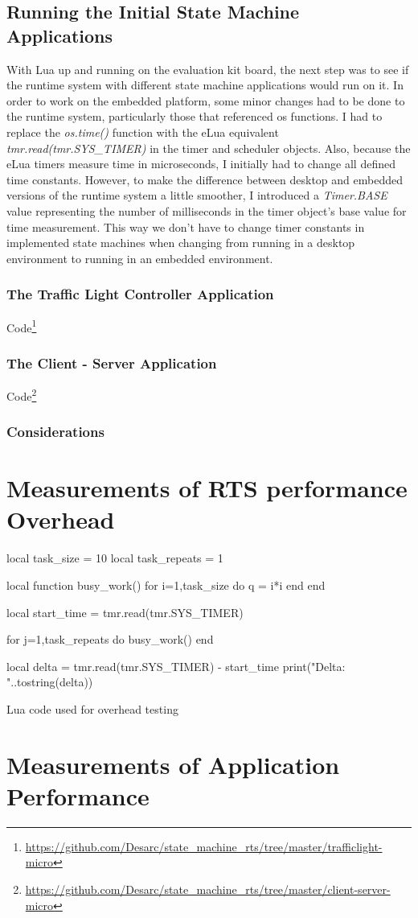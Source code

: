 \subsection{Running the Initial State Machine Applications}
\label{sec:running_initial}
With Lua up and running on the evaluation kit board, the next step was to see if the runtime system with different state machine applications would run on it. In order to work on the embedded platform, some minor changes had to be done to the runtime system, particularly those that referenced \gls{os} functions. I had to replace the \emph{os.time()} function with the eLua equivalent \emph{tmr.read(tmr.SYS\_TIMER)} in the timer and scheduler objects. Also, because the eLua timers measure time in microseconds, I initially had to change all defined time constants. However, to make the difference between desktop and embedded versions of the runtime system a little smoother, I introduced a \emph{Timer.BASE} value representing the number of milliseconds in the timer object's base value for time measurement. This way we don't have to change timer constants in implemented state machines when changing from running in a desktop environment to running in an embedded environment.

\subsubsection{The Traffic Light Controller Application}
Code\footnote{\url{https://github.com/Desarc/state_machine_rts/tree/master/trafficlight-micro}}


\subsubsection{The Client - Server Application}
Code\footnote{\url{https://github.com/Desarc/state_machine_rts/tree/master/client-server-micro}}

\subsubsection{Considerations}




\section{Measurements of RTS performance Overhead}
\label{sec:overhead_measure}

\begin{listing}[h]
\begin{luacode}
local task_size = 10
local task_repeats = 1

local function busy_work()
	for i=1,task_size do
		q = i*i
	end
end

local start_time = tmr.read(tmr.SYS_TIMER)

for j=1,task_repeats do
	busy_work()
end

local delta = tmr.read(tmr.SYS_TIMER) - start_time
print("Delta: "..tostring(delta))
\end{luacode}
	\caption{Lua code used for overhead testing}
	\label{code:overhead}
\end{listing}

\section{Measurements of Application Performance}
\label{sec:performance_measure}

